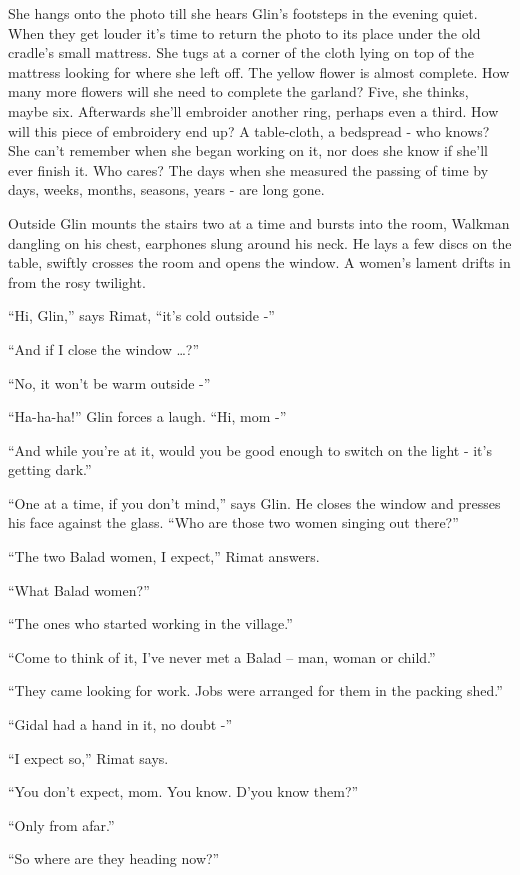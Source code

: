 \documentclass[twoside,11pt]{book}
\begin{document}
She hangs onto the photo till she hears Glin's footsteps in the
evening quiet. When they get louder it's time to return the photo to
its place under the old cradle's small mattress. She tugs at a
corner of the cloth lying on top of the
mattress looking for where she left off. The yellow flower is almost
complete. How many more flowers will she need to complete the
garland? Five, she thinks, maybe six. Afterwards she'll embroider
another ring, perhaps even a third.
How will this piece of embroidery end
up?
A table-cloth, a bedspread - who knows? She can't remember when she
began working on it, nor does she know if she'll ever finish it. Who
cares? The days when she measured the passing of time by days, weeks, months, seasons, years - are long gone.

Outside Glin mounts the stairs
two at a time and bursts into the room, Walkman dangling on his
chest, earphones slung around his neck. He lays a few discs on the
table, swiftly crosses the room and opens the window.
A women's lament drifts in from the rosy twilight.

``Hi, Glin,''
says Rimat,  ``it's cold outside -''

``And if I close the window \dots?''

``No, it won't be warm outside -''

``Ha-ha-ha!'' Glin forces a
laugh. ``Hi, mom -''

``And while you're at it, would you be good enough to switch on the
light - it's getting dark.''

``One at a time, if you don't
mind,'' says Glin. He closes the window and presses his face against
the glass. ``Who are those
two women singing out
there?''

``The two Balad women, I
expect,'' Rimat answers.

``What Balad women?''

``The ones who started working in the
village.''

``Come to think of it, I've never met a Balad -- man,
woman or child.''

``They came looking for work. Jobs were arranged for them in the
packing shed.''

``Gidal had a hand in it, no doubt -''

``I expect
so,'' Rimat says.

``You
don't expect, mom. You know.
D'you know them?''

``Only from afar.''

``So where are they heading now?''
\end{document}
